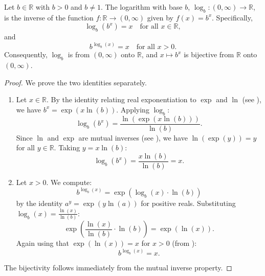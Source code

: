 \begin{proposition} \label{proposition:logarithm_base_b_is_inverse_of_b_to_the_x}
    Let $b \in \mathbb{R}$ with $b > 0$ and $b \neq 1$. The logarithm with base $b$, $\log_b : (0, \infty) \to \mathbb{R}$, is the inverse of the function $f: \mathbb{R} \to (0, \infty)$ given by $f(x) = b^x$. Specifically,
    $$\log_b(b^x) = x \quad \text{for all } x \in \mathbb{R},$$
    and
    $$b^{\log_b(x)} = x \quad \text{for all } x > 0.$$
    Consequently, $\log_b$ is  from $(0, \infty)$ onto $\mathbb{R}$, and $x \mapsto b^x$ is bijective from $\mathbb{R}$ onto $(0, \infty)$.
\end{proposition}
\begin{proof}
    We prove the two identities separately.

    \begin{enumerate}
        \item Let $x \in \mathbb{R}$. By the identity relating real exponentiation to $\exp$ and $\ln$ (see ), we have $b^x = \exp(x \ln(b))$. Applying $\log_b$:
        $$\log_b(b^x) = \frac{\ln(\exp(x \ln(b)))}{\ln(b)}.$$
        Since $\ln$ and $\exp$ are mutual inverses (see ), we have $\ln(\exp(y)) = y$ for all $y \in \mathbb{R}$. Taking $y = x \ln(b)$:
        $$\log_b(b^x) = \frac{x \ln(b)}{\ln(b)} = x.$$

        \item Let $x > 0$. We compute:
        $$b^{\log_b(x)} = \exp(\log_b(x) \cdot \ln(b))$$
        by the identity $a^y = \exp(y \ln(a))$ for positive reals. Substituting $\log_b(x) = \frac{\ln(x)}{\ln(b)}$:
        $$\exp\left( \frac{\ln(x)}{\ln(b)} \cdot \ln(b) \right) = \exp(\ln(x)).$$
        Again using that $\exp(\ln(x)) = x$ for $x > 0$ (from ):
        $$b^{\log_b(x)} = x.$$
    \end{enumerate}

    The bijectivity follows immediately from the mutual inverse property.
\end{proof}
